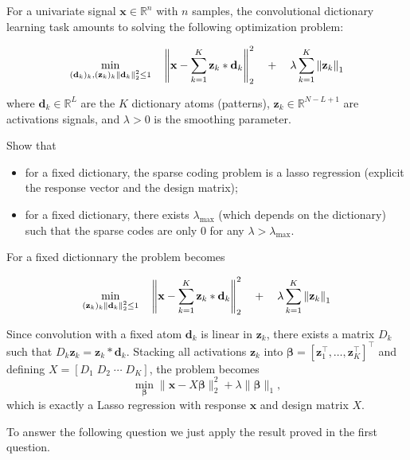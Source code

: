 \documentclass[11pt]{article}
\begin{document}
\begin{exercise}
For a univariate signal $\mathbf{x}\in\mathbb{R}^n$ with $n$ samples, the convolutional dictionary learning task amounts to solving the following optimization problem:

\begin{equation}
\min_{(\mathbf{d}_k)_k, (\mathbf{z}_k)_k \\ \left\lVert\mathbf{d}_k\right\rVert_2^2\leq 1} \quad\left\lVert\mathbf{x} - \sum_{k=1}^K \mathbf{z}_k * \mathbf{d}_k \right\rVert^2_2 \quad + \quad\lambda \sum_{k=1}^K \left\lVert\mathbf{z}_k\right\rVert_1
\end{equation}

where $\mathbf{d}_k\in\mathbb{R}^L$ are the $K$ dictionary atoms (patterns), $\mathbf{z}_k\in\mathbb{R}^{N-L+1}$ are activations signals, and $\lambda>0$ is the smoothing parameter.

Show that
\begin{itemize}
    \item for a fixed dictionary, the sparse coding problem is a lasso regression (explicit the response vector and the design matrix);
    \item for a fixed dictionary, there exists $\lambda_{\max}$ (which depends on the dictionary) such that the sparse codes are only 0 for any $\lambda > \lambda_{\max}$. 
\end{itemize}
\end{exercise}

\begin{solution}  %

For a fixed dictionnary the problem becomes

\begin{equation}
\min_{(\mathbf{z}_k)_k \\ \left\lVert\mathbf{d}_k\right\rVert_2^2\leq 1} \quad\left\lVert\mathbf{x} - \sum_{k=1}^K \mathbf{z}_k * \mathbf{d}_k \right\rVert^2_2 \quad + \quad\lambda \sum_{k=1}^K \left\lVert\mathbf{z}_k\right\rVert_1
\end{equation}

Since convolution with a fixed atom $\mathbf{d}_k$ is linear in $\mathbf{z}_k$, there exists a matrix 
$D_k$ such that $D_k \mathbf{z}_k = \mathbf{z}_k * \mathbf{d}_k$.
Stacking all activations $\mathbf{z}_k$ into 
$\boldsymbol{\beta} = [\mathbf{z}_1^\top,\dots,\mathbf{z}_K^\top]^\top$
and defining 
$X = [D_1 \; D_2 \; \cdots \; D_K]$, the problem becomes
\[
\min_{\boldsymbol{\beta}} 
\|\mathbf{x} - X\boldsymbol{\beta}\|_2^2 + \lambda \|\boldsymbol{\beta}\|_1,
\]
which is exactly a Lasso regression with response $\mathbf{x}$ and design matrix $X$.

To answer the following question we just apply the result proved in the first question. 



\end{solution}
\end{document}
